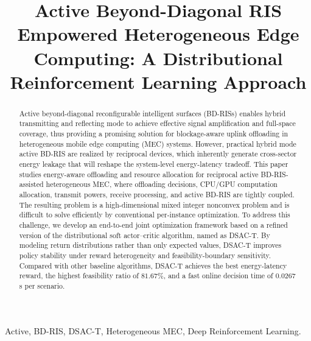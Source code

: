 \documentclass[conference]{IEEEtran}
\begin{document}
\title{Active Beyond-Diagonal RIS Empowered Heterogeneous Edge Computing: A Distributional Reinforcement Learning Approach}



\author{
}


\maketitle

\begin{abstract}
Active beyond-diagonal reconfigurable intelligent surfaces (BD-RISs) enables hybrid transmitting and reflecting mode to achieve effective signal amplification and full-space coverage, thus providing a promising solution for blockage-aware uplink offloading in heterogeneous mobile edge computing (MEC) systems. 
However, practical hybrid mode active BD-RIS are realized by reciprocal devices, which inherently generate cross-sector energy leakage that will reshape the system-level energy-latency tradeoff.
This paper studies energy-aware offloading and resource allocation for reciprocal active BD-RIS-assisted heterogeneous MEC, where offloading decisions, CPU/GPU computation allocation, transmit powers, receive processing, and active BD-RIS are tightly coupled. The resulting problem is a high-dimensional mixed integer nonconvex problem and is difficult to solve efficiently by conventional per-instance optimization. 
To address this challenge, we develop an end-to-end joint optimization framework based on a refined version of the distributional soft actor--critic algorithm, named as DSAC-T.
By modeling return distributions rather than only expected values, DSAC-T improves policy stability under reward heterogeneity and feasibility-boundary sensitivity. 
Compared with other baseline algorithms, DSAC-T achieves the best energy-latency reward, the highest feasibility ratio of $81.67$\%, and a fast online decision time of $0.0267$ s per scenario.
\end{abstract}

\begin{IEEEkeywords}
Active, BD-RIS, DSAC-T, Heterogeneous MEC, Deep Reinforcement Learning.
\end{IEEEkeywords}
\end{document}

